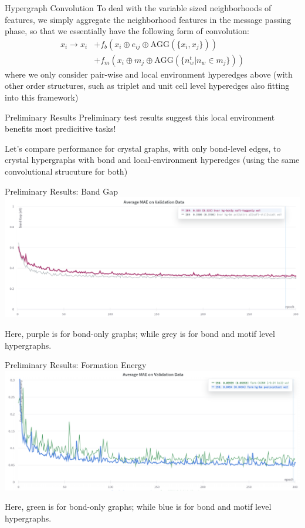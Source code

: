 \documentclass[11pt]{beamer}
\begin{document}
\begin{frame}{Hypergraph Convolution}
To deal with the variable sized neighborhoods of features, we simply aggregate the neighborhood features in the message passing phase, so that we essentially have the following form of convolution:
\begin{align*}
x_i \rightarrow x_i &+ f_b(x_i\oplus e_{ij} \oplus \text{AGG}(\lbrace x_i, x_j\rbrace))\\
&+ f_m(x_i\oplus m_{j} \oplus \text{AGG}(\lbrace  n_w^t \vert n_w \in m_j \rbrace))
\end{align*}
where we only consider pair-wise and local environment hyperedges above (with other order structures, such as triplet and unit cell level hyperedges also fitting into this framework)

\end{frame}

\begin{frame}{Preliminary Results}
Preliminary test results suggest this local environment benefits most predicitive tasks!

\vspace{0.8cm}

Let's compare performance for crystal graphs, with only bond-level edges, to crystal hypergraphs with bond and local-environment hyperedges (using the same convolutional strucuture for both) 
\end{frame}


\begin{frame}{Preliminary Results: Band Gap}
\includegraphics[scale=0.3]{bvsbm.png}

Here, purple is for bond-only graphs; while grey is for bond and motif level hypergraphs.
\end{frame}



\begin{frame}{Preliminary Results: Formation Energy}
\includegraphics[scale=0.3]{bvsbm_form.png}

Here, green is for bond-only graphs; while blue is for bond and motif level hypergraphs.
\end{frame}
\end{document}
